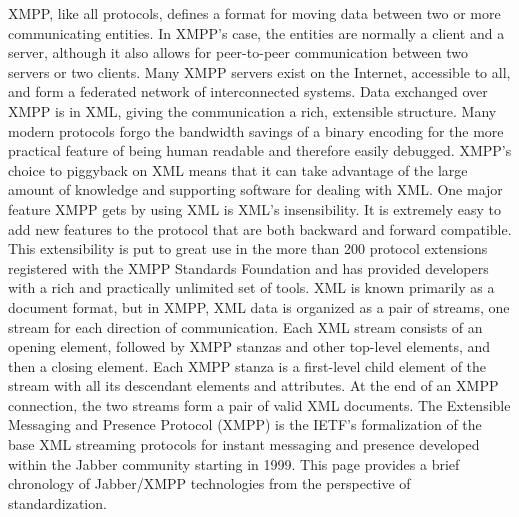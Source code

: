     XMPP, like all protocols, defines a format for moving data between two or more communicating entities. In XMPP’s case, the entities are normally a client and a server, although it also allows for peer-to-peer communication between two servers or two clients. Many XMPP servers exist on the Internet, accessible to all, and form a federated network of interconnected systems. Data exchanged over XMPP is in XML, giving the communication a rich, extensible structure. Many modern protocols forgo the bandwidth savings of a binary encoding for the more practical feature of being human readable and therefore easily debugged. XMPP’s choice to piggyback on XML means that it can take advantage of the large amount of knowledge and supporting software for dealing with XML. One major feature XMPP gets by using XML is XML’s insensibility. It is extremely easy to add new features to the protocol that are both backward and forward compatible. This extensibility is put to great use in the more than 200 protocol extensions registered with the XMPP Standards Foundation and has provided developers with a rich and practically unlimited set of tools. XML is known primarily as a document format, but in XMPP, XML data is organized as a pair of streams, one stream for each direction of communication. Each XML stream consists of an opening element, followed by XMPP stanzas and other top-level elements, and then a closing element. Each XMPP stanza is a first-level child element of the stream with all its descendant elements and attributes. At the end of an XMPP connection, the two streams form a pair of valid XML documents.
    The Extensible Messaging and Presence Protocol (XMPP) is the IETF’s formalization of the base XML streaming protocols for instant messaging and presence developed within the Jabber community starting in 1999. This page provides a brief chronology of Jabber/XMPP technologies from the perspective of standardization\cite{xmpp}.
